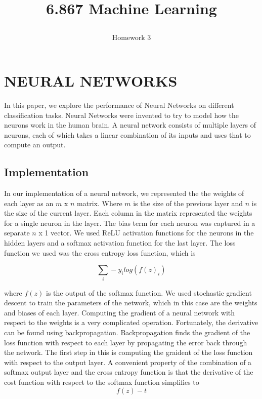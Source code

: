 \documentclass[10pt,twoside]{article}
\begin{document}
\title{6.867 Machine Learning  \subtitle{Homework 3} }

\maketitle


\section{\uppercase{Neural Networks}}

\noindent In this paper, we explore the performance of Neural Networks on different classification tasks. Neural Networks were invented to try to model how the neurons work in the human brain. A neural network consists of multiple layers of neurons, each of which takes a linear combination of its inputs and uses that to compute an output. 


\subsection{Implementation}

In our implementation of a neural network, we represented the the weights of each layer as an $m$ x $n$ matrix. Where $m$ is the size of the previous layer and $n$ is the size of the current layer. Each column in the matrix represented the weights for a single neuron in the layer. The bias term for each neuron was captured in a separate $n$ x 1 vector. We used ReLU activation functions for the neurons in the hidden layers and a softmax activation function for the last layer. The loss function we used was the cross entropy loss function, which is 

\begin{equation}
\sum _i -y_i log(f(z)_i)
\end{equation}

where $f(z)$ is the output of the softmax function. We used stochastic gradient descent to train the parameters of the network, which in this case are the weights and biases of each layer. Computing the gradient of a neural network with respect to the weights is a very complicated operation. Fortunately, the derivative can be found using backpropagation. Backpropagation finds the gradient of the loss function with respect to each layer by propagating the error back through the network. The first step in this is computing the graident of the loss function with respect to the output layer. A convenient property of the combination of a softmax output layer and the cross entropy function is that the derivative of the cost function with respect to the softmax function simplifies to 
\begin{equation}
f(z)-t
\end{equation}
\end{document}
